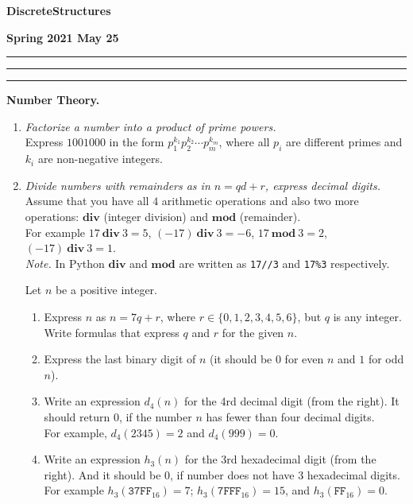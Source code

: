 \documentclass[a4paper,12pt]{article}
\begin{document}
\begin{center}
\parbox{3cm}{\flushleft\bf Discrete\linebreak Structures}
\hfill
\parbox{7cm}{}
\hfill
\parbox{3cm}{\flushright\bf Spring 2021 \linebreak May 25}
\end{center}

\hrule\vspace{2pt}\hrule

\hrule



\vspace{10pt}
{\bf Number Theory.}

\begin{enumerate}

\item {\small \em
Factorize a number into a product of prime powers.}\\
Express $1001000$ in the form $p_1^{k_1} p_2^{k_2} \cdots p_m^{k_m}$, 
where all $p_i$ are different primes and $k_i$ are non-negative integers. 


\item {\small \em
Divide numbers with remainders as in $n = qd + r$, express decimal digits.}\\
Assume that you have all $4$ arithmetic operations and also two 
more operations: $\mathbf{div}$ (integer division) and $\mathbf{mod}$ 
(remainder).\\ 
For example $17\ \mathbf{div}\ 3 = 5$, 
$(-17)\ \mathbf{div}\ 3 = -6$, $17\ \mathbf{mod}\ 3 = 2$, 
$(-17)\ \mathbf{div}\ 3 = 1$.\\
{\em Note.} In Python $\mathbf{div}$ and $\mathbf{mod}$  are 
written as {\tt 17//3} and {\tt 17\%3} respectively.

Let $n$ be a positive integer. 
\begin{enumerate}
\item Express $n$ as $n = 7q + r$, where $r \in \{ 0,1,2,3,4,5,6 \}$, 
but $q$ is any integer. Write formulas that express $q$ and $r$ for the given $n$.
\item Express the last binary digit of $n$ (it should be $0$ for even $n$
and $1$ for odd $n$). 
\item
Write an expression $d_4(n)$ for the 
4rd decimal digit (from the right). It should return $0$, if the number
$n$ has fewer than four decimal digits.\\
For example, $d_4(2345) = 2$
and $d_4(999) = 0$. 
\item 
Write an expression $h_3(n)$ for the 3rd hexadecimal digit (from the right).
And it should be $0$, if number does not have $3$ hexadecimal digits.\\
For example $h_3(\mathtt{37FF}_{16}) =7$; $h_3(\mathtt{7FFF}_{16}) = 15$, 
and $h_3(\mathtt{FF}_{16}) = 0$. 
\end{enumerate}


\end{enumerate}
\end{document}
